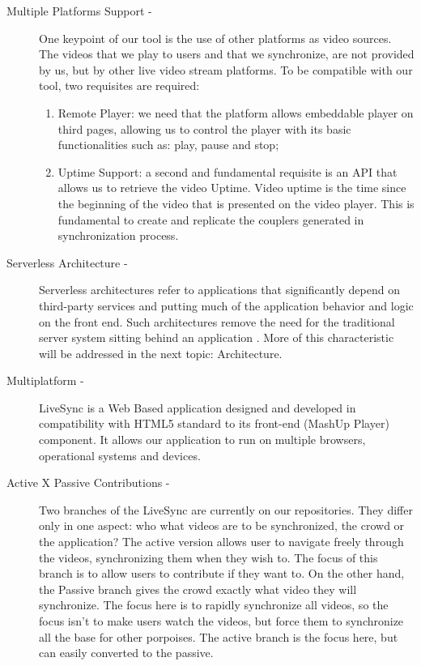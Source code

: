 \documentclass{sig-alternate-05-2015}
\begin{document}
\begin{description}
	\item[Multiple Platforms Support -] One keypoint of our tool is the use of other platforms as video sources. The videos that we play to users and that we synchronize, are not provided by us, but by other live video stream platforms. To be compatible with our tool, two requisites are required:
	\begin{enumerate}
		\item Remote Player: we need that the platform allows embeddable player on third pages, allowing us to control the player with its basic functionalities such as: play, pause and stop;
		\item Uptime Support: a second and fundamental requisite is an API that allows us to retrieve the video Uptime. Video uptime is the time since the beginning of the video that is presented on the video player. This is fundamental to create and replicate the couplers generated in synchronization process.
	\end{enumerate}
	
	\item[Serverless Architecture -] Serverless architectures refer to applications that significantly depend on third-party services and putting much of the application behavior and logic on the front end. Such architectures remove the need for the traditional server system sitting behind an application \cite{RobertServerless}. More of this characteristic will be addressed in the next topic: Architecture.
	
	\item[Multiplatform -] LiveSync is a Web Based application designed and developed in compatibility with HTML5 standard to its front-end (MashUp Player) component. It allows our application to run on multiple browsers, operational systems and devices.
	
	\item[Active X Passive Contributions -] Two branches of the LiveSync are currently on our repositories. They differ only in one aspect: who what videos are to be synchronized, the crowd or the application? The active version allows user to navigate freely through the videos, synchronizing them when they wish to. The focus of this branch is to allow users to contribute if they want to. On the other hand, the Passive branch gives the crowd exactly what video they will synchronize. The focus here is to rapidly synchronize all videos, so the focus isn't to make users watch the videos, but force them to synchronize all the base for other porpoises. The active branch is the focus here, but can easily converted to the passive.
	
\end{description}
\end{document}
